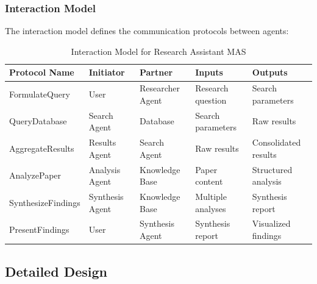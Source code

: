 \documentclass[11pt,a4paper]{article}
\begin{document}
\subsubsection{Interaction Model}
The interaction model defines the communication protocols between agents:

\begin{table}[H]
    \centering
    \begin{tabular}{|p{3cm}|p{2.5cm}|p{2.5cm}|p{3cm}|p{3cm}|}
    \hline
    \textbf{Protocol Name} & \textbf{Initiator} & \textbf{Partner} & \textbf{Inputs} & \textbf{Outputs} \\
    \hline
    FormulateQuery & User & Researcher Agent & Research question & Search parameters \\
    \hline
    QueryDatabase & Search Agent & Database & Search parameters & Raw results \\
    \hline
    AggregateResults & Results Agent & Search Agent & Raw results & Consolidated results \\
    \hline
    AnalyzePaper & Analysis Agent & Knowledge Base & Paper content & Structured analysis \\
    \hline
    SynthesizeFindings & Synthesis Agent & Knowledge Base & Multiple analyses & Synthesis report \\
    \hline
    PresentFindings & User & Synthesis Agent & Synthesis report & Visualized findings \\
    \hline
    \end{tabular}
    \caption{Interaction Model for Research Assistant MAS}
    \label{tab:interaction-model}
\end{table}



\subsection{Detailed Design}
\end{document}
